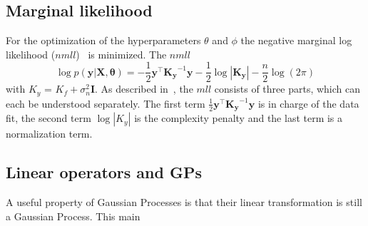 \documentclass{article}
\begin{document}
\subsection{Marginal likelihood}

For the optimization of the hyperparameters $\theta$ and $\phi$ the negative
marginal log likelihood ($nmll$)~\cite{RasmussenCarlEdward} is minimized. The
$nmll$
\begin{equation}
    \log p(\bm{y}|\bm{X},\bm{\theta}) = -\frac{1}{2}\bm{y}^\intercal \bm{K_y}^{-1}\bm{y} - \frac{1}{2}\log\left\lvert \bm{K_y}\right\rvert - \frac{n}{2}\log(2\pi)
\end{equation}
with $K_y$ = $K_f + \sigma_n^2 \bm{I}$. As described in~\cite{RasmussenCarlEdward}, the $mll$ consists of three parts, which can each be understood separately. The first term $\frac{1}{2}\bm{y}^\intercal \bm{K_y}^{-1}\bm{y}$ is in charge of the data fit, the second term $\log\left\lvert K_y\right\rvert$ is the complexity penalty and the last term is a normalization term.

\subsection{Linear operators and GPs}
A useful property of Gaussian Processes is that their linear transformation is
still a Gaussian Process. This main
\end{document}
